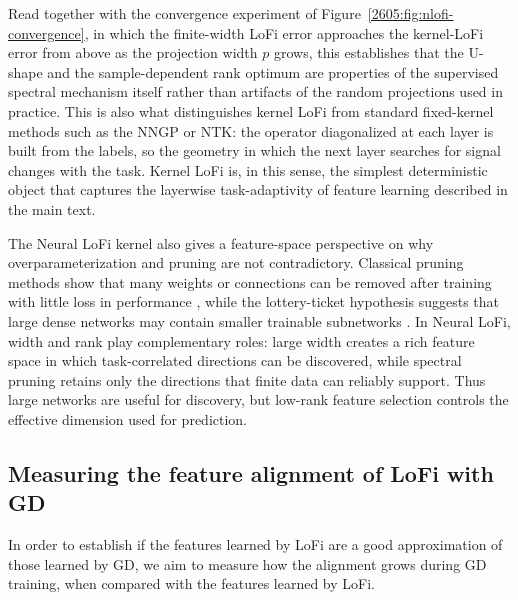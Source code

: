 Read together with the convergence experiment of
Figure~\ref{2605:fig:nlofi-convergence}, in which the finite-width LoFi error
approaches the kernel-LoFi error from above as the projection width $p$
grows, this establishes that the U-shape and the sample-dependent rank
optimum are properties of the supervised spectral mechanism itself rather
than artifacts of the random projections used in practice. 
This is also
what distinguishes kernel LoFi from standard fixed-kernel methods such as
the NNGP or NTK: the operator diagonalized at each layer is built from the
labels, so the geometry in which the next layer searches for signal changes
with the task. 
Kernel LoFi is, in this sense, the simplest deterministic
object that captures the layerwise task-adaptivity of feature learning
described in the main text.


The Neural LoFi kernel also gives a feature-space perspective on why overparameterization and pruning are not contradictory. Classical pruning methods show that many weights or connections can be removed after training with little loss in performance
\cite{lecun1989optimal,han2015learning}, while the lottery-ticket hypothesis suggests that large dense networks may contain smaller trainable subnetworks
\cite{frankle2020linear}. In Neural LoFi, width and rank play complementary roles: large width creates a rich feature space in which task-correlated directions can be discovered, while spectral pruning retains only the directions that finite data can reliably support. Thus large networks are useful for discovery, but low-rank feature selection controls the effective dimension used for prediction.



\subsection{Measuring the feature alignment of LoFi with GD} \label{2605:app:gd-feature-alignment}
In order to establish if the features learned by LoFi are a good approximation of those learned by GD, we aim to measure how the alignment grows during GD training, when compared with the features learned by LoFi. 

